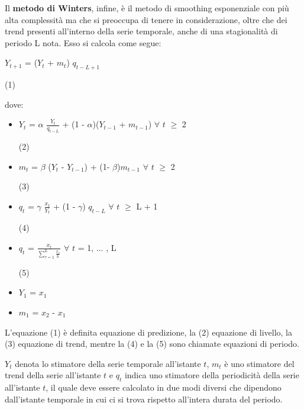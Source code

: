\documentclass[12pt,a4paper,twoside,openright]{book}
\begin{document}
Il {\bfseries metodo di Winters}, infine, è il metodo di smoothing esponenziale con più alta complessità ma che si preoccupa di tenere in considerazione, oltre che dei trend presenti all'interno della serie temporale, anche di una stagionalità di periodo L nota. Esso si calcola come segue:

\begin{center}
$Y_{t+1}$ = ($Y_{t}$ + $m_{t}$) $q_{t-L+1}$
\end{center}
\begin{flushright}
(1)
\end{flushright}
dove:
\medskip \medskip
\begin{itemize}

\item $Y_{t}$ = $\alpha$ $\frac{Y_{t}}{q_{t-L} }$ + (1 - $\alpha$)($Y_{t-1}$ + $m_{t-1}$) $\forall$ $t$ $\geq$ 2 
\begin{flushright}
(2)
\end{flushright}
\item $m_{t}$ = $\beta$ ($Y_{t}$ - $Y_{t-1}$) + (1- $\beta$)$m_{t-1}$   $\forall$ $t$ $\geq$ 2
\begin{flushright}
(3)
\end{flushright}
\item $q_{t}$ = $\gamma$ $\frac{x_{t}}{Y_{t}}$ + (1 - $\gamma$) $q_{t-L}$  $\forall$ $t$ $\geq$ L + 1 
\begin{flushright}
(4)
\end{flushright}
\item $q_{t}$ = $\frac{x_{t}}{\sum_{\tau=1}^{L}{\frac{x_{\tau}}{L}}}$ $\forall$ $t$ = 1, $\dots$ , L
\begin{flushright}
(5)
\end{flushright}

\item $Y_{1}$ = $x_{1}$

\item $m_{1}$ = $x_{2}$ - $x_{1}$
\end{itemize}

L'equazione (1) è definita equazione di predizione, la (2) equazione di livello, la (3) equazione di trend, mentre la (4) e la (5) sono chiamate equazioni di periodo.

$Y_{t}$ denota lo stimatore della serie temporale all'istante $t$, $m_{t}$ è uno stimatore del trend della serie all'istante $t$ e $q_{t}$ indica uno stimatore della periodicità della serie all'istante $t$, il quale deve essere calcolato in due modi diversi che dipendono dall'istante temporale in cui ci si trova rispetto all'intera durata del periodo.
\end{document}
